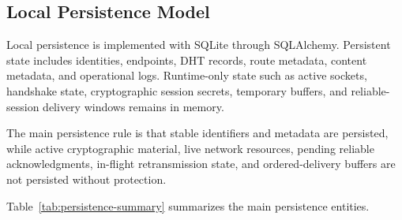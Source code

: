 \documentclass[12pt]{article}
\begin{document}
\subsection{Local Persistence Model}
\label{sec:local-persistence-model}

Local persistence is implemented with SQLite through SQLAlchemy. Persistent state includes identities, endpoints, DHT records, route metadata, content metadata, and operational logs. Runtime-only state such as active sockets, handshake state, cryptographic session secrets, temporary buffers, and reliable-session delivery windows remains in memory.

The main persistence rule is that stable identifiers and metadata are persisted, while active cryptographic material, live network resources, pending reliable acknowledgments, in-flight retransmission state, and ordered-delivery buffers are not persisted without protection.

Table~\ref{tab:persistence-summary} summarizes the main persistence entities.
\end{document}
